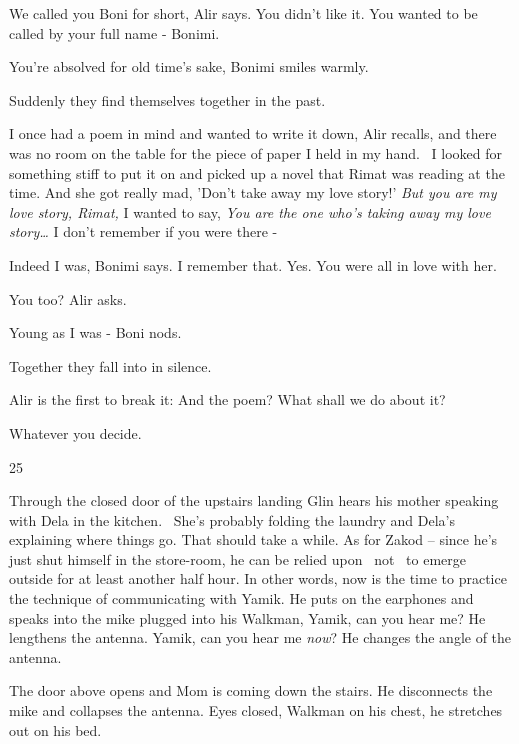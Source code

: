\documentclass[letterpaper]{article}
\begin{document}
{\textquotedbl}We called you Boni for short,{\textquotedbl} Alir says. {\textquotedbl}You didn't like it. You wanted to
be called by your full name - Bonimi.{\textquotedbl}

{\textquotedbl}You're absolved for old time's sake,{\textquotedbl} Bonimi smiles warmly. 

Suddenly they find themselves together in the past. 

{\textquotedbl}I once had a poem in mind and wanted to write it down,{\textquotedbl} Alir recalls, {\textquotedbl}and
there was no room on the table for the piece of paper I held in my hand. ~I looked for something stiff to put it on and
picked up a novel that Rimat was reading at the time. And she got really mad, 'Don't take away my love story!'
\textit{But you are my love story, Rimat, }I wanted to say, \textit{You are the one who's taking away my love
story{\dots}} I don't remember if you were there -{\textquotedbl} 

{\textquotedbl}Indeed I was,{\textquotedbl} Bonimi says. {\textquotedbl}I remember that. Yes. You were all in love with
her.{\textquotedbl} 

{\textquotedbl}You too?{\textquotedbl} Alir asks. 

{\textquotedbl}Young as I was -{\textquotedbl} Boni nods. 

Together they fall into in silence.

Alir is the first to break it: {\textquotedbl}And the poem? What shall we do about it?{\textquotedbl} 

{\textquotedbl}Whatever you decide.{\textquotedbl}


\bigskip

25~~

Through the closed door of the upstairs landing Glin hears his mother speaking with Dela in the kitchen. \ She's
probably folding the laundry and Dela's explaining where things go. That should take a while. As for Zakod -- since
he's just shut himself in the store-room, he can be relied upon \ not \ to emerge outside for at least another half
hour. In other words, now is the time to practice the technique of communicating with Yamik. He puts on the earphones
and speaks into the mike plugged into his Walkman, {\textquotedbl}Yamik, can you hear me?{\textquotedbl} He lengthens
the antenna. {\textquotedbl}Yamik, can you hear me \textit{now}?{\textquotedbl} He changes the angle of the antenna.

The door above opens and Mom is coming down the stairs. He disconnects the mike and collapses\textcolor{red}{ }the
antenna. Eyes closed, Walkman on his chest, he stretches out on his bed.
\end{document}
